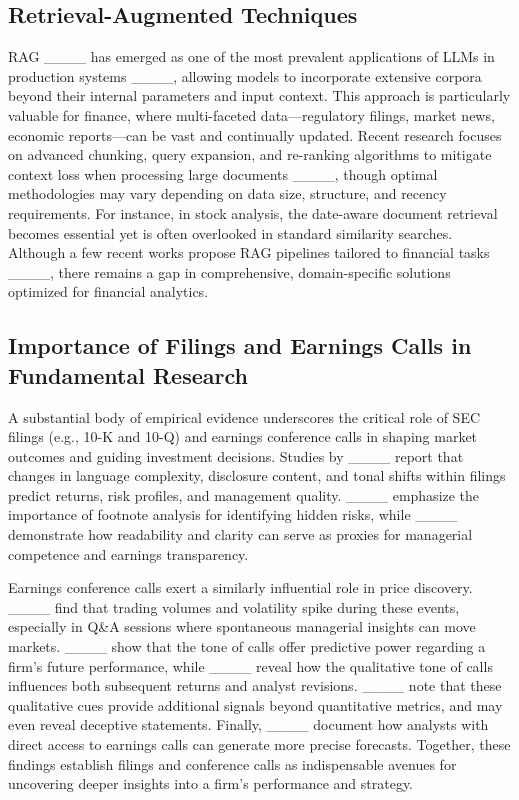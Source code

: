 \subsection{Retrieval-Augmented Techniques}
RAG ____ has emerged as one of the most prevalent applications of LLMs in production systems ____, allowing models to incorporate extensive corpora beyond their internal parameters and input context. This approach is particularly valuable for finance, where multi-faceted data—regulatory filings, market news, economic reports—can be vast and continually updated. Recent research focuses on advanced chunking, query expansion, and re-ranking algorithms to mitigate context loss when processing large documents ____, though optimal methodologies may vary depending on data size, structure, and recency requirements. For instance, in stock analysis, the date-aware document retrieval becomes essential yet is often overlooked in standard similarity searches. Although a few recent works propose RAG pipelines tailored to financial tasks ____, there remains a gap in comprehensive, domain-specific solutions optimized for financial analytics.

\subsection{Importance of Filings and Earnings Calls in Fundamental Research}
A substantial body of empirical evidence underscores the critical role of SEC filings (e.g., 10-K and 10-Q) and earnings conference calls in shaping market outcomes and guiding investment decisions. Studies by ____ report that changes in language complexity, disclosure content, and tonal shifts within filings predict returns, risk profiles, and management quality. ____ emphasize the importance of footnote analysis for identifying hidden risks, while ____ demonstrate how readability and clarity can serve as proxies for managerial competence and earnings transparency.

Earnings conference calls exert a similarly influential role in price discovery. ____ find that trading volumes and volatility spike during these events, especially in Q\&A sessions where spontaneous managerial insights can move markets. ____ show that  the tone of calls offer predictive power regarding a firm’s future performance, while ____ reveal how the qualitative tone of calls influences both subsequent returns and analyst revisions. ____ note that these qualitative cues provide additional signals beyond quantitative metrics, and may even reveal deceptive statements. Finally, ____ document how analysts with direct access to earnings calls can generate more precise forecasts. Together, these findings establish filings and conference calls as indispensable avenues for uncovering deeper insights into a firm’s performance and strategy.

